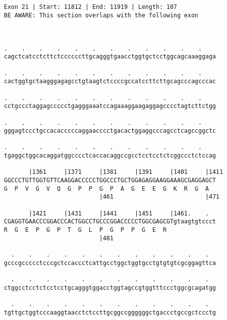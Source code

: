 \documentclass{article}
\begin{document}
\begin{Verbatim}
                                                      
 
Exon 21 | Start: 11812 | End: 11919 | Length: 107
BE AWARE: This section overlaps with the following exon



.    .    .    .    .    .    .    .    .    .    .    .    
cagctcatcctcttctccccccttgcagggtgaacctggtgctcctggcagcaaaggaga
                                                            
.    .    .    .    .    .    .    .    .    .    .    .    
cactggtgctaagggagagcctgtaagtctccccgccatccttcttgcagcccagcccac
                                                            
.    .    .    .    .    .    .    .    .    .    .    .    
cctgccctaggagccccctgagggaaatccagaaaggaagaggagcccctagtcttctgg
                                                            
.    .    .    .    .    .    .    .    .    .    .    .    
gggagtccctgccacacccccaggaacccctgacactggaggcccagcctcagccggctc
                                                            
.    .    .    .    .    .    .    .    .    .    .    .    
tgaggctggcacaggatggcccctcaccacaggccgcctcctcctctcggccctctccag
                                                            
       |1361     |1371     |1381     |1391     |1401     |1411
GGCCCTGTTGGTGTTCAAGGACCCCCTGGCCCTGCTGGAGAGGAAGGAAAGCGAGGAGCT
G  P  V  G  V  Q  G  P  P  G  P  A  G  E  E  G  K  R  G  A  
                           |461                          |471
  
       |1421     |1431     |1441     |1451     |1461.    .  
CGAGGTGAACCCGGACCCACTGGCCTGCCCGGACCCCCTGGCGAGCGTgtaagtgtccct
R  G  E  P  G  P  T  G  L  P  G  P  P  G  E  R              
                           |481                             
  
  .    .    .    .    .    .    .    .    .    .    .    .  
gcccgccccctcccgctccaccctcattgcctggctggtgcctgtgtgtcgcggagttca
                                                            
  .    .    .    .    .    .    .    .    .    .    .    .  
ctggcctcctctcctcctgcagggtggacctggtagccgtggtttccctggcgcagatgg
                                                            
  .    .    .    .    .    .    .    .    .    .    .    .  
tgttgctggtcccaaggtaacctctccttgcggccggggggctgaccctgccgctccctg
                                                            

\end{Verbatim}
\end{document}
